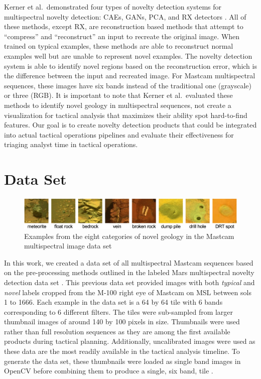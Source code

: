 Kerner et al.~demonstrated four types of novelty detection systems for multispectral novelty detection: CAEs, GANs, PCA, and RX detectors \parencite{kerner2020comparison}. 
All of these methods, except RX, are reconstruction based methods that attempt to ``compress'' and ``reconstruct'' an input to recreate the original image. 
When trained on typical examples, these methods are able to reconstruct normal examples well but are unable to represent novel examples.
The novelty detection system is able to identify novel regions based on the reconstruction error, which is the difference between the input and recreated image.
For Mastcam multispectral sequences, these images have six bands instead of the traditional one (grayscale) or three (RGB). 
It is important to note that Kerner et al.~evaluated these methods to identify novel geology in multispectral sequences, not create a visualization for tactical analysis that maximizes their ability spot hard-to-find features. 
Our goal is to create novelty detection products that could be integrated into actual tactical operations pipelines and evaluate their effectiveness for triaging analyst time in tactical operations.

\section{Data Set}
\begin{figure}
\centering
\includegraphics[width=\linewidth]{figs/msl/categories.png}
\caption[Novel Geology Categories for Mastcam Multispectral Images]{Examples from the eight categories of novel geology in the Mastcam multispectral image data set \protect\parencite{kerner_data}} 
\label{msl/fig:NovelCategories}
\end{figure}

In this work, we created a data set of all multispectral Mastcam sequences based on the pre-processing methods outlined in the labeled Mars multispectral novelty detection data set \parencite{kerner_data}.
This previous data set provided images with both \textit{typical} and \textit{novel} labels cropped from the M-100 right eye of Mastcam on MSL between sols 1 to 1666.
Each example in the data set is a 64 by 64 tile with 6 bands corresponding to 6 different filters.
The tiles were sub-sampled from larger thumbnail images of around 140 by 100 pixels in size. 
Thumbnails were used rather than full resolution sequences as they are among the first available products during tactical planning. 
Additionally, uncalibrated images were used as these data are the most readily available in the tactical analysis timeline. 
To generate the data set, these thumbnails were loaded as single band images in OpenCV before combining them to produce a single, six band, tile \parencite{opencv_library}.

